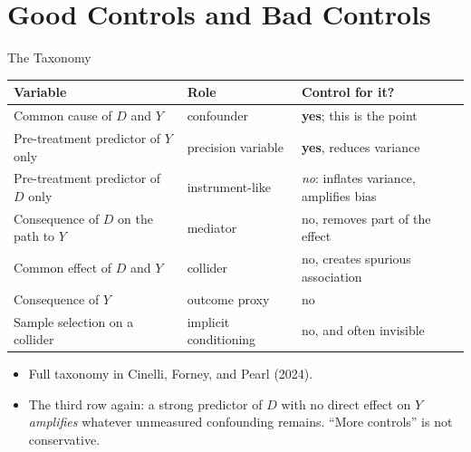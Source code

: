 \documentclass[aspectratio=169,11pt,xcolor=dvipsnames]{beamer}
\newcommand{\core}{\,\raisebox{0.6pt}{\textcolor{corestar}{$\bigstar$}}}
\begin{document}
\section[Controls]{Good Controls and Bad Controls}
\begin{frame}\sectionpage\end{frame}

\begin{frame}{The Taxonomy\core}
\begin{center}\footnotesize
\renewcommand{\arraystretch}{1.2}
\begin{tabular}{lll}
\toprule
Variable & Role & Control for it? \\
\midrule
Common cause of $D$ and $Y$ & confounder & \textbf{yes}; this is the point \\
Pre-treatment predictor of $Y$ only & precision variable & \textbf{yes}, reduces variance \\
Pre-treatment predictor of $D$ only & instrument-like & \emph{no}: inflates variance, amplifies bias \\
Consequence of $D$ on the path to $Y$ & mediator & \alert{no}, removes part of the effect \\
Common effect of $D$ and $Y$ & collider & \alert{no}, creates spurious association \\
Consequence of $Y$ & outcome proxy & \alert{no} \\
Sample selection on a collider & implicit conditioning & \alert{no}, and often invisible \\
\bottomrule
\end{tabular}
\end{center}
\vskip3pt
\begin{itemize}\itemsep2pt
  \item Full taxonomy in Cinelli, Forney, and Pearl (2024).
  \item The third row again: a strong predictor of $D$ with no direct effect
        on $Y$ \emph{amplifies} whatever unmeasured confounding remains.
        ``More controls'' is not conservative.
\end{itemize}
\end{frame}
\end{document}
